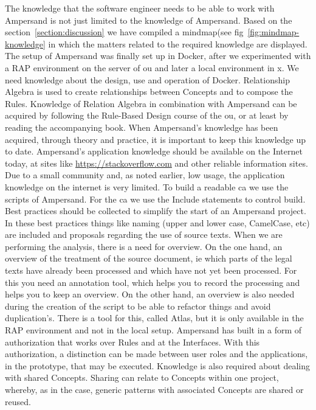 The knowledge that the software engineer needs to be able to work with Ampersand is not just limited to the knowledge of Ampersand. 
Based on the section~\ref{section:discussion} we have compiled a mindmap(see fig~\ref{fig:mindmap-knowledge} in which the matters related to the required knowledge are displayed.
The setup of Ampersand was finally set up in Docker, after we experimented with a RAP environment on the server of \acrlong{ou} and later a local environment in \acrshort{x}.
We need knowledge about the design, use and operation of Docker.
Relationship Algebra is used to create relationships between Concepts and to compose the Rules.
Knowledge of Relation Algebra in combination with Ampersand can be acquired by following the Rule-Based Design course of the \acrshort{ou}, or at least by reading the accompanying book.
When Ampersand's knowledge has been acquired, through theory and practice, it is important to keep this knowledge up to date.
Ampersand's application knowledge should be available on the Internet today, at sites like \url{https://stackoverflow.com} and other reliable information sites.
Due to a small community and, as noted earlier, low usage, the application knowledge on the internet is very limited.
To build a readable \acrlong{ca} we use the scripts of Ampersand.
For the \acrlong{ca} we use the Include statements to control build.
Best practices should be collected to simplify the start of an Ampersand project.
In these best practices things like naming (upper and lower case, CamelCase, etc) are included and proposals regarding the use of source texts.
When we are performing the analysis, there is a need for overview.
On the one hand, an overview of the treatment of the source document, ie which parts of the legal texts have already been processed and which have not yet been processed.
For this you need an annotation tool, which helps you to record the processing and helps you to keep an overview.
On the other hand, an overview is also needed during the creation of the script to be able to refactor things and avoid duplication's.
There is a tool for this, called Atlas, but it is only available in the RAP environment and not in the local setup.
Ampersand has built in a form of authorization that works over Rules and at the Interfaces.
With this authorization, a distinction can be made between user roles and the applications, in the prototype, that may be executed.
Knowledge is also required about dealing with shared Concepts.
Sharing can relate to Concepts within one project, whereby, as in the case, generic patterns with associated Concepts are shared or reused.
